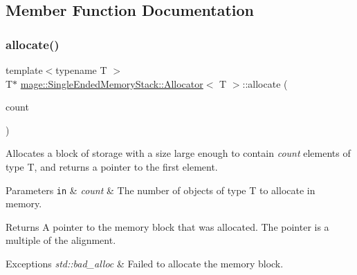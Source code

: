 \subsection{Member Function Documentation}
\mbox{\label{classmage_1_1_single_ended_memory_stack_1_1_allocator_a4fde02dc87017337b3c670147a606427}} 
\subsubsection{\texorpdfstring{allocate()}{allocate()}\hspace{0.1cm}{\footnotesize\ttfamily [1/2]}}
{\footnotesize\ttfamily template$<$typename T $>$ \\
T$\ast$ \mbox{\hyperlink{classmage_1_1_single_ended_memory_stack_1_1_allocator}{mage\+::\+Single\+Ended\+Memory\+Stack\+::\+Allocator}}$<$ T $>$\+::allocate (\begin{DoxyParamCaption}\item[{std\+::size\+\_\+t}]{count }\end{DoxyParamCaption})}

Allocates a block of storage with a size large enough to contain {\itshape count} elements of type {\ttfamily T}, and returns a pointer to the first element.


\begin{DoxyParams}[1]{Parameters}
\mbox{\tt in}  & {\em count} & The number of objects of type {\ttfamily T} to allocate in memory. \\
\hline
\end{DoxyParams}
\begin{DoxyReturn}{Returns}
A pointer to the memory block that was allocated. The pointer is a multiple of the alignment. 
\end{DoxyReturn}

\begin{DoxyExceptions}{Exceptions}
{\em std\+::bad\+\_\+alloc} & Failed to allocate the memory block. \\
\hline
\end{DoxyExceptions}
\mbox{\label{classmage_1_1_single_ended_memory_stack_1_1_allocator_a7104725b8d2a183257ec3dc7a9c6601a}} 
